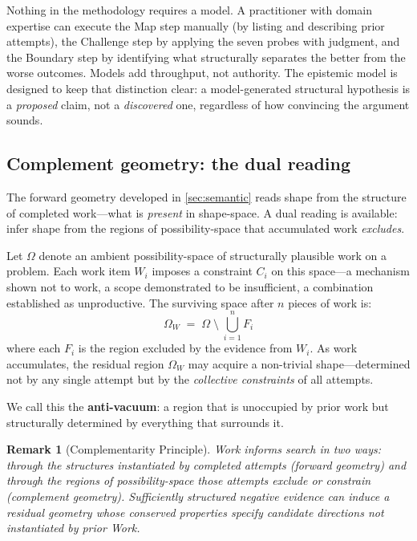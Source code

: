 \documentclass[11pt]{article}
\theoremstyle{gowthm}
\newtheorem{remark}{Remark}[section]
\theoremstyle{gowplain}
\begin{document}
Nothing in the methodology requires a model. A practitioner with domain
expertise can execute the Map step manually (by listing and describing prior
attempts), the Challenge step by applying the seven probes with judgment, and
the Boundary step by identifying what structurally separates the better from the
worse outcomes. Models add throughput, not authority. The epistemic model is
designed to keep that distinction clear: a model-generated structural hypothesis
is a \emph{proposed} claim, not a \emph{discovered} one, regardless of how
convincing the argument sounds.

\subsection{Complement geometry: the dual reading}
\label{sec:complement}

The forward geometry developed in \cref{sec:semantic} reads shape from the
structure of completed work---what is \emph{present} in shape-space. A dual
reading is available: infer shape from the regions of possibility-space that
accumulated work \emph{excludes}.

Let $\Omega$ denote an ambient possibility-space of structurally plausible
work on a problem. Each work item $W_i$ imposes a constraint $C_i$ on this
space---a mechanism shown not to work, a scope demonstrated to be insufficient,
a combination established as unproductive. The surviving space after $n$ pieces
of work is:
\[
\Omega_W \;=\; \Omega \;\setminus\; \bigcup_{i=1}^{n} F_i
\]
where each $F_i$ is the region excluded by the evidence from $W_i$. As work
accumulates, the residual region $\Omega_W$ may acquire a non-trivial
shape---determined not by any single attempt but by the \emph{collective
constraints} of all attempts.

We call this the \textbf{anti-vacuum}: a region that is unoccupied by prior work
but structurally determined by everything that surrounds it.

\begin{remark}[Complementarity Principle]
Work informs search in two ways: through the structures instantiated by completed
attempts (\emph{forward geometry}) and through the regions of possibility-space
those attempts exclude or constrain (\emph{complement geometry}). Sufficiently
structured negative evidence can induce a residual geometry whose conserved
properties specify candidate directions not instantiated by prior Work.
\end{remark}
\end{document}

